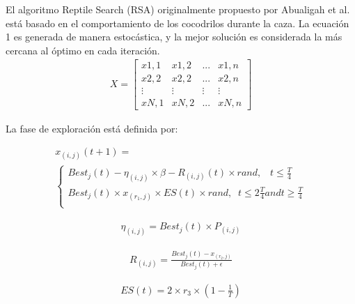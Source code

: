 \documentclass[conference]{IEEEtran}
\begin{document}
\noindent El algoritmo Reptile Search (RSA) originalmente propuesto por Abualigah et al.~\cite{Abualigah2022} está basado en el comportamiento de los cocodrilos durante la caza. 
\noindent La ecuación 1 es generada de manera estocástica, y la mejor solución es considerada la más cercana al óptimo en cada iteración.
\begin{equation}
	\begin{gathered}
		X= \begin{bmatrix}
			x1,1 & x1,2 & ... & x1,n  \\
			x2,2 & x2,2 & ... & x2,n  \\
			\vdots & \vdots & \vdots & \vdots \\
			xN,1 & xN,2 & ... & xN,n
		\end{bmatrix}
	\end{gathered}
	\label{eq33}
\end{equation}

\noindent La fase de exploración está definida por:

\begin{equation}
	\begin{gathered}
		x_{(i,j)}(t+1)=\\
		\begin{cases}
			Best_j (t) - \eta_{(i,j)}\times \beta-R_{(i,j)}(t)\times rand, \; \; \; t \leq \frac{T}{4}               \\
			Best_j (t) \times x_{(r_1,j)} \times ES(t) \times rand, \; \; t \leq 2\frac{T}{4} and t \geq \frac{T}{4} \\
		\end{cases}
	\end{gathered}
	\label{eq34}
\end{equation}   

\begin{equation}
	\begin{gathered}
		\eta_{(i,j)}=Best_j(t)\times P_{(i,j)}
	\end{gathered}
	\label{eq35}
\end{equation}

\begin{equation}
	\begin{gathered}
		R_{(i,j)}=\frac{Best_j(t) - x_{(r_2,j)}}{Best_j(t) +\epsilon}
	\end{gathered}
	\label{eq36}
\end{equation}

\begin{equation}
	\begin{gathered}
		ES(t)=2 \times r_3 \times (1 - \frac{1}{T})
	\end{gathered}
	\label{eq37}
\end{equation}
\end{document}
